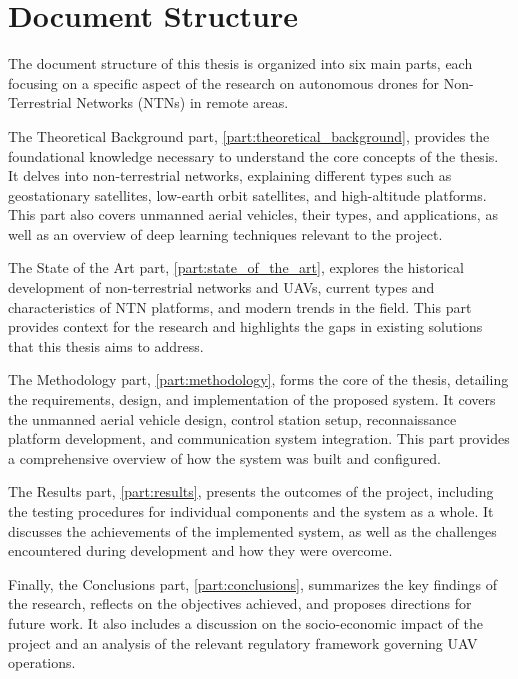 \chapter{Document Structure}\label{ch:document_structure}

The document structure of this thesis is organized into six main parts, each focusing on a specific aspect of the research on autonomous drones for Non-Terrestrial Networks (NTNs) in remote areas.

The Theoretical Background part, \cref{part:theoretical_background}, provides the foundational knowledge necessary to understand the core concepts of the thesis. It delves into non-terrestrial networks, explaining different types such as geostationary satellites, low-earth orbit satellites, and high-altitude platforms. This part also covers unmanned aerial vehicles, their types, and applications, as well as an overview of deep learning techniques relevant to the project.

The State of the Art part, \cref{part:state_of_the_art}, explores the historical development of non-terrestrial networks and UAVs, current types and characteristics of NTN platforms, and modern trends in the field. This part provides context for the research and highlights the gaps in existing solutions that this thesis aims to address.

The Methodology part, \cref{part:methodology}, forms the core of the thesis, detailing the requirements, design, and implementation of the proposed system. It covers the unmanned aerial vehicle design, control station setup, reconnaissance platform development, and communication system integration. This part provides a comprehensive overview of how the system was built and configured.

The Results part, \cref{part:results}, presents the outcomes of the project, including the testing procedures for individual components and the system as a whole. It discusses the achievements of the implemented system, as well as the challenges encountered during development and how they were overcome.

Finally, the Conclusions part, \cref{part:conclusions}, summarizes the key findings of the research, reflects on the objectives achieved, and proposes directions for future work. It also includes a discussion on the socio-economic impact of the project and an analysis of the relevant regulatory framework governing UAV operations.
